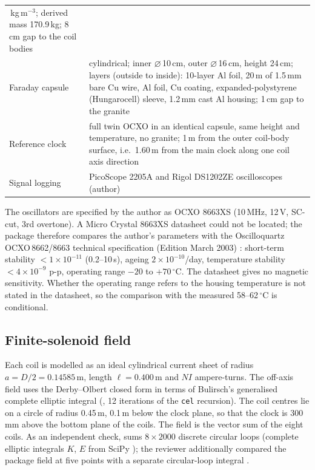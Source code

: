 \documentclass[12pt,a4paper]{article}
\begin{document}
\begin{table}[t]
\begin{tabularx}{\textwidth}{>{\raggedright\arraybackslash}p{4.3cm}X}
2700\,kg\,m$^{-3}$; derived mass 170.9\,kg; 8\,cm gap to the coil bodies \\
Faraday capsule & cylindrical; inner $\varnothing$\,10\,cm, outer $\varnothing$\,16\,cm, height 24\,cm;
layers (outside to inside): 10-layer Al foil, 20\,m of 1.5\,mm bare Cu wire, Al foil, Cu coating,
expanded-polystyrene (Hungarocell) sleeve, 1.2\,mm cast Al housing; 1\,cm gap to the granite \\
Reference clock & full twin OCXO in an identical capsule, same height and temperature, no granite;
1\,m from the outer coil-body surface, i.e.\ 1.60\,m from the main clock along one coil axis direction \\
Signal logging & PicoScope 2205A and Rigol DS1202ZE oscilloscopes (author) \\
\bottomrule
\end{tabularx}
\end{table}

The oscillators are specified by the author as OCXO 8663XS (10\,MHz, 12\,V, SC-cut, 3rd overtone).
A Micro Crystal 8663XS datasheet could not be located; the package therefore compares the author's
parameters with the Oscilloquartz OCXO\,8662/8663 technical specification (Edition March 2003)
\cite{OSA8663}: short-term stability $<1\times10^{-11}$ (0.2--10\,s), ageing $2\times10^{-10}$/day,
temperature stability $<4\times10^{-9}$ p-p, operating range $-20$ to $+70\,^\circ$C. The datasheet
gives no magnetic sensitivity. Whether the operating range refers to the housing temperature is not
stated in the datasheet, so the comparison with the measured 58--62\,$^\circ$C is conditional.

\subsection{Finite-solenoid field}\label{sec:field}
Each coil is modelled as an ideal cylindrical current sheet of radius $a=D/2=0.14585$\,m, length
$\ell=0.400$\,m and $NI$ ampere-turns. The off-axis field uses the Derby--Olbert closed form in terms of
Bulirsch's generalised complete elliptic integral \cite{Derby2010} (, 12 iterations of
the \texttt{cel} recursion). The coil centres lie on a circle of radius 0.45\,m, 0.1\,m below the clock
plane, so that the clock is 300\,mm above the bottom plane of the coils. The field is the vector sum of the
eight coils. As an independent check,  sums $8\times2000$ discrete circular
loops (complete elliptic integrals $K$, $E$ from SciPy \cite{SciPy2020}); the reviewer additionally compared the
package field at five points with a separate circular-loop integral \cite{TAL_V20}.
\end{document}
